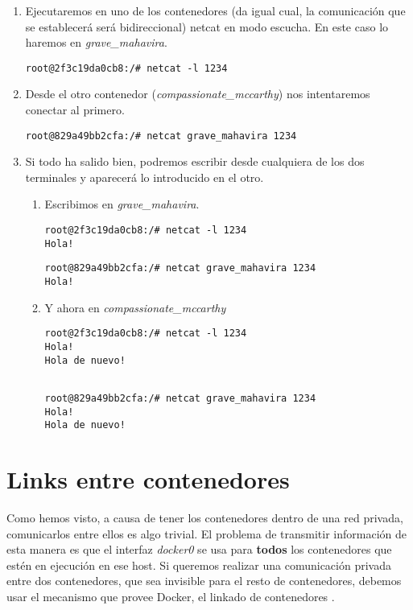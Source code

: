 		\begin{enumerate}
			\item Ejecutaremos en uno de los contenedores (da igual cual, la comunicación que se establecerá será bidireccional) netcat en modo escucha. En este caso lo haremos en \textit{grave\_mahavira}.
				\begin{lstlisting}[style=consola]
root@2f3c19da0cb8:/# netcat -l 1234

				\end{lstlisting}
			\item Desde el otro contenedor (\textit{compassionate\_mccarthy}) nos intentaremos conectar al primero.
				\begin{lstlisting}[style=consola]
root@829a49bb2cfa:/# netcat grave_mahavira 1234

				\end{lstlisting}			
			\item Si todo ha salido bien, podremos escribir desde cualquiera de los dos terminales y aparecerá lo introducido en el otro.
			\begin{enumerate}
				\item Escribimos en \textit{grave\_mahavira}.
				\begin{lstlisting}[style=consola]
root@2f3c19da0cb8:/# netcat -l 1234
Hola!

				\end{lstlisting}
				\begin{lstlisting}[style=consola]
root@829a49bb2cfa:/# netcat grave_mahavira 1234
Hola!

				\end{lstlisting}	
				\item Y ahora en \textit{compassionate\_mccarthy}
				\begin{lstlisting}[style=consola]
root@2f3c19da0cb8:/# netcat -l 1234
Hola!
Hola de nuevo!				
				
				\end{lstlisting}
				\begin{lstlisting}[style=consola]
root@829a49bb2cfa:/# netcat grave_mahavira 1234
Hola!
Hola de nuevo!

				\end{lstlisting}
			\end{enumerate}
		\end{enumerate}
	
	\section{Links entre contenedores}
	Como hemos visto, a causa de tener los contenedores dentro de una red privada, comunicarlos entre ellos es algo trivial. El problema de transmitir información de esta manera es que el interfaz \emph{docker0} se usa para \textbf{todos} los contenedores que estén en ejecución en ese host. Si queremos realizar una comunicación privada entre dos contenedores, que sea invisible para el resto de contenedores, debemos usar el mecanismo que provee Docker, el linkado de contenedores \cite{docker-network-linking}.
	
